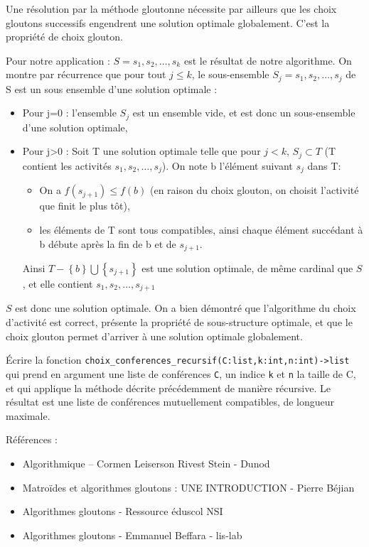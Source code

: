 Une résolution par la méthode gloutonne nécessite par ailleurs que les choix gloutons successifs engendrent une solution optimale globalement. C’est la propriété de choix glouton.

Pour notre application :
$S={s_1,s_2,…,s_k}$  est le résultat de notre algorithme. On montre par récurrence que pour tout $j\leq k$, le sous-ensemble $S_j={s_1,s_2,… ,s_j}$ de S est un sous ensemble d’une solution optimale :
\begin{itemize}
	\item Pour j=0 : l'ensemble $S_j$ est un ensemble vide, et est donc un sous-ensemble d'une solution optimale,
	\item Pour j>0 : Soit T une solution optimale telle que pour $j<k$,  $S_j\subset T$  (T contient les activités $s_1,s_2,… ,s_j$). On note b l’élément suivant $s_j$ dans T: 
	\begin{itemize}
		\item On a $f(s_{j+1}  ) \leq f(b)$ (en raison du choix glouton, on choisit l’activité que finit le plus tôt),
		\item les éléments de T sont tous compatibles, ainsi chaque élément succédant à b débute après la fin de b et de $s_{j+1}$.
	\end{itemize}
Ainsi $T- \left\{b\right\} \bigcup \left\{s_{j+1} \right\}$ est une solution optimale, de même cardinal  que $S$, et elle contient $s_1,s_2,… ,s_{j+1} $
\end{itemize}
	
$S$ est donc une solution optimale.
On a bien démontré que l’algorithme du choix d’activité est correct, présente la propriété de sous-structure optimale, et que le choix glouton permet d’arriver à une solution optimale globalement.


\begin{question}
\'Ecrire la fonction \lstinline{choix_conferences_recursif(C:list,k:int,n:int)->list} qui prend en argument une liste de conférences \lstinline{C}, un indice \lstinline{k} et \lstinline{n} la taille de C, et qui applique la méthode décrite précédemment de manière récursive. 
Le résultat est une liste de conférences mutuellement compatibles, de longueur maximale.
\end{question}

\vfill


Références :
\begin{itemize}
\item Algorithmique – Cormen Leiserson Rivest Stein - Dunod 
\item Matroïdes et algorithmes gloutons : UNE INTRODUCTION - Pierre Béjian 
\item Algorithmes gloutons - Ressource éduscol NSI 
\item Algorithmes gloutons - Emmanuel Beffara - lis-lab 
\end{itemize}

